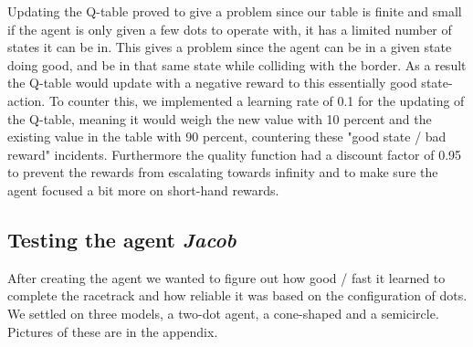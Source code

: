 Updating the Q-table proved to give a problem since our table is finite and small if the agent is only given a few dots to operate with, it has a limited number of states it can be in. This gives a problem since the agent can be in a given state doing good, and be in that same state while colliding with the border. As a result the Q-table would update with a negative reward to this essentially good state-action. To counter this, we implemented a learning rate of 0.1 for the updating of the Q-table, meaning it would weigh the new value with 10 percent and the existing value in the table with 90 percent, countering these "good state / bad reward"  incidents. Furthermore the quality function had a discount factor of 0.95 to prevent the rewards from escalating towards infinity and to make sure the agent focused a bit more on short-hand rewards.

\subsection{Testing the agent \small\textit{Jacob}}
After creating the agent we wanted to figure out how good / fast it learned to complete the racetrack and how reliable it was based on the configuration of dots. We settled on three models, a two-dot agent, a cone-shaped and a semicircle. Pictures of these are in the appendix. 

